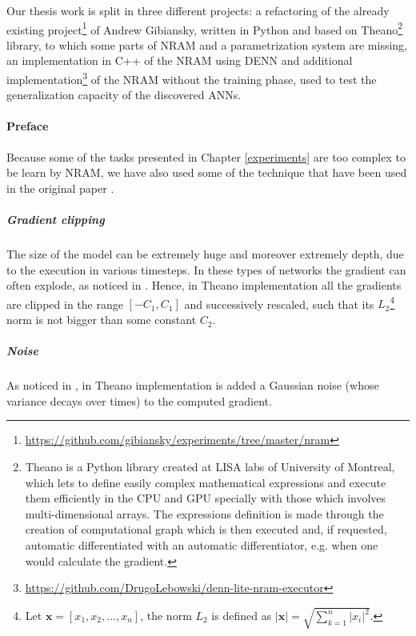 \label{chap:implementation}
Our thesis work is split in three different projects: a refactoring of the already existing project\footnote{\hyperref[https://github.com/gibiansky/experiments/tree/master/nram]{https://github.com/gibiansky/experiments/tree/master/nram}} of Andrew Gibiansky, written in Python and based on Theano\footnote{Theano is a Python library created at LISA labs of University of Montreal, which lets to define easily complex mathematical expressions and execute them efficiently in the CPU and GPU specially with those which involves multi-dimensional arrays. The expressions definition is made through the creation of computational graph which is then executed and, if requested, automatic differentiated with an automatic differentiator, e.g. when one would calculate the gradient.} library, to which some parts of NRAM and a parametrization system are missing, an implementation in C++ of the NRAM using DENN and additional implementation\footnote{\hyperref[https://github.com/DrugoLebowski/denn-lite-nram-executor]{https://github.com/DrugoLebowski/denn-lite-nram-executor}} of the NRAM without the training phase, used to test the generalization capacity of the discovered ANNs.


\paragraph{Preface}
Because some of the tasks presented in Chapter \ref{experiments} are too complex to be learn by NRAM, we have also used some of the technique that have been used in the original paper \cite{NRAM:2016}.

\subparagraph{Gradient clipping}
The size of the model can be extremely huge and moreover extremely depth, due to the execution in various timesteps. In these types of networks the gradient can often explode, as noticed in \cite{Bengio1994LearningLD}. Hence, in Theano implementation all the gradients are clipped in the range $[-C_1, C_1]$ and successively rescaled, such that its $L_2$\footnote{Let $\textbf{x} = [x_1, x_2, \dots, x_n]$, the norm $L_2$ is defined as $|\textbf{x}| = \sqrt{\sum\limits_{k=1}^{n}|x_i|^2}$.} norm is not bigger than some constant $C_2$.

\subparagraph{Noise}
As noticed in \cite{Neelakantan2015AddingGN}, in Theano implementation is added a Gaussian noise (whose variance decays over times) to the computed gradient.

